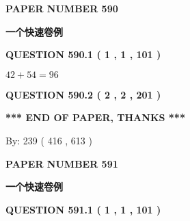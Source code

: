 \documentclass{ctexart}
\begin{document}
   
 {\textbf{ \Large{ PAPER NUMBER  590  }}}
   
   
\vspace{0.2in}
   
   
   
   
   
   
 \vspace{0.2in}
{\LARGE {\textbf{ 一个快速卷例}}}
   
   
  
\vspace{0.2in}
  
{\textbf{\Large{QUESTION
590.1 
 ( 1 , 1 , 101 )
}}}
  
  
 
 

$ %
42 +  %
54=   %
96$
 
 
  
\vspace{0.2in}
  
{\textbf{\Large{QUESTION
590.2 
 ( 2 , 2 , 201 )
}}}
  
  
   
   
 \vspace{0.2in}
 
   
   
   
   
\vspace{1.0in} 
{\textbf{\large{ *** END OF PAPER, THANKS *** }}} 
   
   
\hspace{1.0in} By: 
 239 ( 416 ,  613 )
   
   
   
   
\newpage 
\setcounter{page}{ 
   591001 } 
   
   
   
   
 {\textbf{ \Large{ PAPER NUMBER  591  }}}
   
   
\vspace{0.2in}
   
   
   
   
   
   
 \vspace{0.2in}
{\LARGE {\textbf{ 一个快速卷例}}}
   
   
  
\vspace{0.2in}
  
{\textbf{\Large{QUESTION
591.1 
 ( 1 , 1 , 101 )
}}}
  
\end{document}
